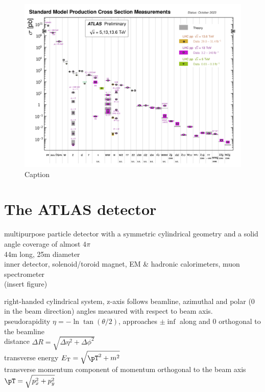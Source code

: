 \documentclass[../thesis.tex]{subfiles}
\begin{document}
\begin{figure}[!htbp]
\begin{center}
\includegraphics[width=\linewidth]{fig/lhc_xsec_Run23.png}
\caption[Caption]{\label{fig:lhc:xsec}Caption \citep{ATL-PHYS-PUB-2023-039}}
\end{center}
\end{figure}


\section{The ATLAS detector}
\label{sec:ATLAS}
multipurpose particle detector with a symmetric cylindrical geometry and a solid angle coverage of almost $4\pi$\\
44m long, 25m diameter\\
inner detector, solenoid/toroid magnet, EM \& hadronic calorimeters, muon spectrometer\\
(insert figure)


right-handed cylindrical system, z-axis follows beamline, azimuthal and polar (0 in the beam direction) angles measured with respect to beam axis.\\
pseudorapidity $\eta = -\ln \tan (\theta/2)$, approaches $\pm\inf$ along and 0 orthogonal to the beamline\\
distance $\Delta R=\sqrt{\Delta \eta^2 + \Delta \phi^2}$\\
transverse energy $E_\text{T}=\sqrt{\pT ^2+m^2}$\\
transverse momentum \pT component of momentum orthogonal to the beam axis $\pT = \sqrt{p_x^2 + p_y^2}$
\end{document}
